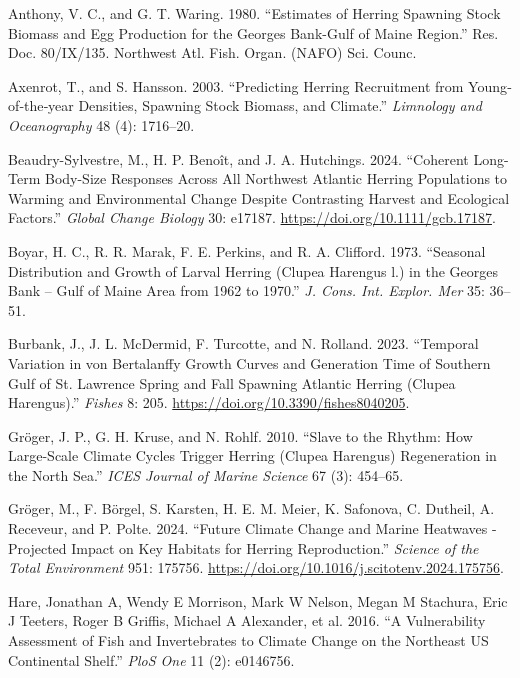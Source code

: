 \documentclass[
  letterpaper,
  DIV=11,
  numbers=noendperiod]{scrartcl}
\newlength{\cslhangindent}
\newenvironment{CSLReferences}[2] %
 {\begin{list}{}{%
  \setlength{\itemindent}{0pt}
  \setlength{\leftmargin}{0pt}
  \setlength{\parsep}{0pt}
  \ifodd #1
   \setlength{\leftmargin}{\cslhangindent}
   \setlength{\itemindent}{-1\cslhangindent}
  \fi
  \setlength{\itemsep}{#2\baselineskip}}}
 {\end{list}}
\begin{document}
\label{refs}
\begin{CSLReferences}{1}{0}
Anthony, V. C., and G. T. Waring. 1980. {``Estimates of Herring Spawning
Stock Biomass and Egg Production for the Georges Bank-Gulf of Maine
Region.''} Res. Doc. 80/IX/135. Northwest Atl. Fish. Organ. (NAFO) Sci.
Counc.

Axenrot, T., and S. Hansson. 2003. {``Predicting Herring Recruitment
from Young‐of‐the‐year Densities, Spawning Stock Biomass, and
Climate.''} \emph{Limnology and Oceanography} 48 (4): 1716--20.

Beaudry-Sylvestre, M., H. P. Benoît, and J. A. Hutchings. 2024.
{``Coherent Long-Term Body-Size Responses Across All Northwest Atlantic
Herring Populations to Warming and Environmental Change Despite
Contrasting Harvest and Ecological Factors.''} \emph{Global Change
Biology} 30: e17187. \url{https://doi.org/10.1111/gcb.17187}.

Boyar, H. C., R. R. Marak, F. E. Perkins, and R. A. Clifford. 1973.
{``Seasonal Distribution and Growth of Larval Herring (Clupea Harengus
l.) in the Georges Bank -- Gulf of Maine Area from 1962 to 1970.''}
\emph{J. Cons. Int. Explor. Mer} 35: 36--51.

Burbank, J., J. L. McDermid, F. Turcotte, and N. Rolland. 2023.
{``Temporal Variation in von Bertalanffy Growth Curves and Generation
Time of Southern Gulf of St. Lawrence Spring and Fall Spawning Atlantic
Herring (Clupea Harengus).''} \emph{Fishes} 8: 205.
\url{https://doi.org/10.3390/fishes8040205}.

Gröger, J. P., G. H. Kruse, and N. Rohlf. 2010. {``Slave to the Rhythm:
How Large-Scale Climate Cycles Trigger Herring (Clupea Harengus)
Regeneration in the North Sea.''} \emph{ICES Journal of Marine Science}
67 (3): 454--65.

Gröger, M., F. Börgel, S. Karsten, H. E. M. Meier, K. Safonova, C.
Dutheil, A. Receveur, and P. Polte. 2024. {``Future Climate Change and
Marine Heatwaves - Projected Impact on Key Habitats for Herring
Reproduction.''} \emph{Science of the Total Environment} 951: 175756.
\url{https://doi.org/10.1016/j.scitotenv.2024.175756}.

Hare, Jonathan A, Wendy E Morrison, Mark W Nelson, Megan M Stachura,
Eric J Teeters, Roger B Griffis, Michael A Alexander, et al. 2016. {``A
Vulnerability Assessment of Fish and Invertebrates to Climate Change on
the Northeast US Continental Shelf.''} \emph{PloS One} 11 (2): e0146756.


\end{CSLReferences}
\end{document}
